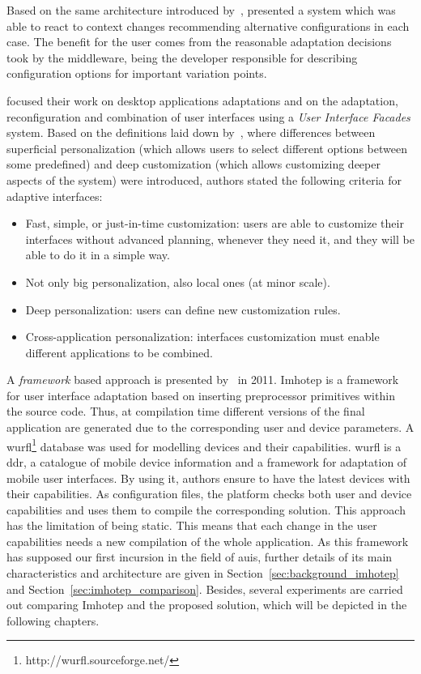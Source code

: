 Based on the same architecture introduced by~\citet{nilsson_model_based_2006},
\citet{hallsteinsen_self_adaptation_2004} presented a system which was able to 
react to context changes recommending alternative configurations in each case.
The benefit for the user comes from the reasonable adaptation decisions took 
by the middleware, being the developer responsible for describing configuration 
options for important variation points.

\citet{stuerzlinger_user_2006} focused their work on desktop applications
adaptations and on the adaptation, reconfiguration and combination of user
interfaces using a \textit{User Interface Facades} system. Based on the definitions
laid down by~\citet{marmolin_medium_1995}, where differences between superficial
personalization (which allows users to select different options between some
predefined) and deep customization (which allows customizing deeper aspects of
the system) were introduced, authors stated the following criteria for adaptive
interfaces:

\begin{itemize}
  \item Fast, simple, or just-in-time customization: users are able to customize
  their interfaces without advanced planning, whenever they need it, and they will
  be able to do it in a simple way.
  \item Not only big personalization, also local ones (at minor scale).
  \item Deep personalization: users can define new customization rules.
  \item Cross-application personalization: interfaces customization must enable 
  different applications to be combined.
\end{itemize}

A \textit{framework} based approach is presented by~\citet{almeida_imhotep_2011}
in 2011. Imhotep is a framework for user interface adaptation based on inserting
preprocessor primitives within the source code. Thus, at compilation time
different versions of the final application are generated due to the corresponding
user and device parameters. A \ac{wurfl}\footnote{http://wurfl.sourceforge.net/} 
database was used for modelling devices and their capabilities. \ac{wurfl} is a 
\ac{ddr}, a catalogue of mobile device information and a framework for adaptation 
of mobile user interfaces. By using it, authors ensure to have the latest devices 
with their capabilities. As configuration files, the platform checks both user 
and device capabilities and uses them to compile the corresponding solution. This 
approach has the limitation of being static. This means that each change in the 
user capabilities needs a new compilation of the whole application. As this
framework has supposed our first incursion in the field of \acp{aui}, further
details of its main characteristics and architecture are given in Section~\ref{sec:background_imhotep}
and Section~\ref{sec:imhotep_comparison}. Besides, several experiments are
carried out comparing Imhotep and the proposed solution, which will be depicted
in the following chapters.

